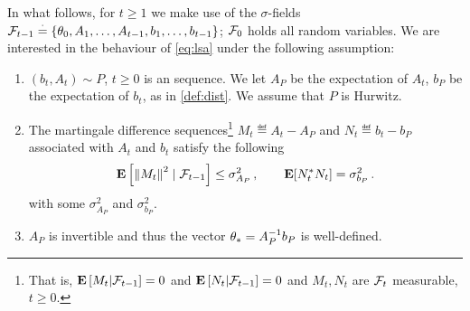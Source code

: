 In what follows, for $t\ge1$ we make use of the $\sigma$-fields $\mathcal{F}_{t-1}\stackrel{\cdot}{=}\{\theta_0,A_1,\ldots, A_{t-1}, b_1,\ldots, b_{t-1}\}$; $\mathcal{F}_0$ holds all random variables. 
We are interested in the behaviour of \eqref{eq:lsa} under the following assumption:
\begin{assumption}\label{assmp:lsa}
\begin{enumerate}[leftmargin=*, before = \leavevmode\vspace{-\baselineskip}]
\item \label{dist} $(b_t, A_t)\sim P$, $t\geq 0$ is an \iid sequence.
We let $A_P$ be the expectation of $A_t$, $b_P$ be the expectation of $b_t$, as in \cref{def:dist}.
We assume that $P$ is Hurwitz.
\item \label{matvar} The martingale difference sequences\footnote{That is, $\mathbf{E}\left[M_t|\mathcal{F}_{t-1}\right]=0$ and $\mathbf{E}\left[N_t|\mathcal{F}_{t-1}\right]=0$ and $M_t,N_t$ are $\mathcal{F}_t$ measurable, $t\ge 0$. } $M_t\eqdef A_t-A_{P}$ and $N_t\eqdef b_t-b_{P}$ associated with $A_t$ and $b_t$ satisfy the following 
\begin{align*}
	\mathbf{E}\left[ \left\| M_t\right\|^2\mid\mathcal{F}_{t-1}\right]\leq \sigma^2_{A_P}\,, \qquad 
	\mathbf{E}[N_t^* N_t]=\sigma^2_{b_P}\,.
\end{align*}
with some $\sigma^2_{A_P}$ and $\sigma^2_{b_P}$. 
\item $A_P$ is invertible and thus the vector $\theta_*=A^{-1}_Pb_P$ is well-defined. 
\end{enumerate}
\end{assumption}
